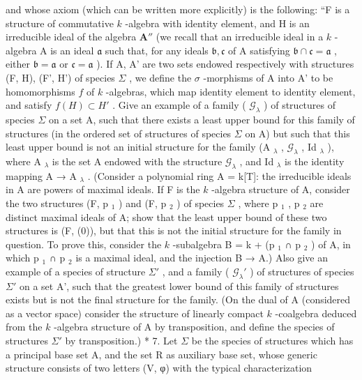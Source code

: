 and whose axiom (which can be written more explicitly) is the following: ``F is a structure of commutative \(k\) -algebra with identity element, and H is an irreducible ideal of the algebra \(\mathbf{A}''\) (we recall that an irreducible ideal in a \(k\) -algebra A is an ideal \(\mathfrak{a}\) such that, for any ideals \(\mathfrak{b}, \mathfrak{c}\) of A satisfying \(\mathfrak{b} \cap \mathfrak{c} = \mathfrak{a}\) , either \(\mathfrak{b} = \mathfrak{a}\) or \(\mathfrak{c} = \mathfrak{a}\) ). If A, A' are two sets endowed respectively with structures (F, H), (F', H') of species \(\Sigma\) , we define the \(\sigma\) -morphisms of A into A' to be homomorphisms \(f\) of \(k\) -algebras, which map identity element to identity element, and satisfy \(f(H) \subset H'\) . Give an example of a family ( \(\mathcal{G}_{\lambda}\) ) of structures of species \(\Sigma\) on a set A, such that there exists a least upper bound for this family of structures (in the ordered set of structures of species \(\Sigma\) on A) but such that this least upper bound is not an initial structure for the family (A \(_{\lambda}\) , \(\mathcal{G}_{\lambda}\) , Id \(_{\lambda}\) ), where A \(_{\lambda}\) is the set A endowed with the structure \(\mathcal{G}_{\lambda}\) , and Id \(_{\lambda}\) is the identity mapping A → A \(_{\lambda}\) . (Consider a polynomial ring A = k{[}T{]}: the irreducible ideals in A are powers of maximal ideals. If F is the \(k\) -algebra structure of A, consider the two structures (F, p \(_1\) ) and (F, p \(_2\) ) of species \(\Sigma\) , where p \(_1\) , p \(_2\) are distinct maximal ideals of A; show that the least upper bound of these two structures is (F, (0)), but that this is not the initial structure for the family in question. To prove this, consider the \(k\) -subalgebra B = k + (p \(_1\) ∩ p \(_2\) ) of A, in which p \(_1\) ∩ p \(_2\) is a maximal ideal, and the injection B → A.) Also give an example of a species of structure \(\Sigma'\) , and a family ( \(\mathcal{G}_{\lambda}'\) ) of structures of species \(\Sigma'\) on a set A', such that the greatest lower bound of this family of structures exists but is not the final structure for the family. (On the dual of A (considered as a vector space) consider the structure of linearly compact \(k\) -coalgebra deduced from the \(k\) -algebra structure of A by transposition, and define the species of structures \(\Sigma'\) by transposition.) * 7. Let \(\Sigma\) be the species of structures which has a principal base set A, and the set R as auxiliary base set, whose generic structure consists of two letters (V, φ) with the typical characterization

